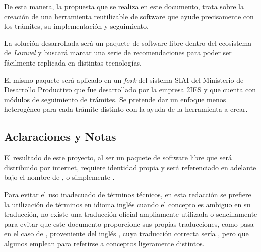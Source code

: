 De esta manera, la propuesta que se realiza en este documento, trata sobre la creación de una herramienta reutilizable de software que ayude precisamente con los trámites, su implementación y seguimiento.

La solución desarrollada será un paquete de software libre dentro del ecosistema de \textit{Laravel} y buscará marcar una serie de recomendaciones para poder ser fácilmente replicada en distintas tecnologías.

El mismo paquete será aplicado en un \textit{fork} del sistema SIAI del Ministerio de Desarrollo Productivo que fue desarrollado por la empresa 2IES y que cuenta con módulos de seguimiento de trámites. Se pretende dar un enfoque menos heterogéneo para cada trámite distinto con la ayuda de la herramienta a crear.

\subsection{Aclaraciones y Notas}
El resultado de este proyecto, al ser un paquete de software libre que será distribuido por internet, requiere identidad propia y será referenciado en adelante bajo el nombre de , o simplemente .

Para evitar el uso inadecuado de términos técnicos, en esta redacción se prefiere la utilización de
términos en idioma inglés cuando el concepto es ambiguo en su traducción, no
existe una traducción oficial ampliamente utilizada o sencillamente para evitar
que este documento proporcione sus propias traducciones, como pasa en el caso de , proveniente del inglés , cuya traducción correcta sería , pero que algunos emplean para referirse a conceptos ligeramente distintos.